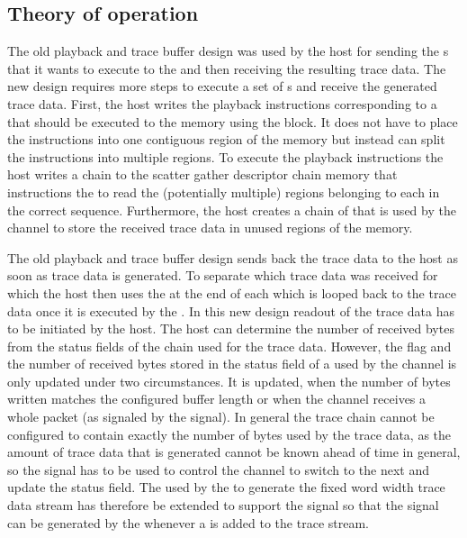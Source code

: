 

\subsection{Theory of operation}
The old playback and trace buffer design was used by the host for sending the \PlaybackProgram{}s that it wants to execute to the \FPGA{} and then receiving the resulting trace data.
The new design requires more steps to execute a set of \PlaybackProgram{}s and receive the generated trace data.
First, the host writes the playback instructions corresponding to a \PlaybackProgram{} that should be executed to the \DDR{} memory using the \FAXI{} block. It does not have to place the instructions into one contiguous region of the memory but instead can split the instructions into multiple regions.
To execute the playback instructions the host writes a \descriptor{} chain to the scatter gather descriptor chain memory that instructions the \AXIDMA{} to read the (potentially multiple) regions belonging to each \PlaybackProgram{} in the correct sequence.
Furthermore, the host creates a chain of \descriptor{} that is used by the \SToMM{} channel to store the received trace data in unused regions of the \DDR{} memory.

The old playback and trace buffer design sends back the trace data to the host as soon as trace data is generated. To separate which trace data was received for which \PlaybackProgram{} the host then uses the \haltInstr{} at the end of each \PlaybackProgram{} which is looped back to the trace data once it is executed by the \pbexec{}.
In this new design readout of the trace data has to be initiated by the host. The host can determine the number of received bytes from the status fields of the \descriptor{} chain used for the trace data.
However, the \completed{} flag and the number of received bytes stored in the status field of a \descriptor{} used by the \SToMM{} channel is only updated under two circumstances. It is updated, when the number of bytes written matches the configured buffer length or when the \SToMM{} channel receives a whole packet (as signaled by the \TLAST{} signal). In general the trace \descriptor{} chain cannot be configured to contain exactly the number of bytes used by the trace data, as the amount of trace data that is generated cannot be known ahead of time in general, so the \TLAST{} signal has to be used to control the \SToMM{} channel to switch to the next \descriptor{} and update the status field.
The \UTEncoder{} used by the \pbexec{} to generate the fixed word width trace data stream has therefore be extended to support the \TLAST{} signal so that the \TLAST{} signal can be generated by the \pbexec{} whenever a \haltInstr{} is added to the trace stream.

